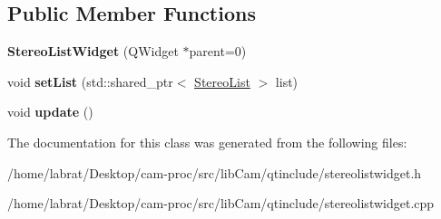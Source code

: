 \subsection*{Public Member Functions}
\begin{DoxyCompactItemize}
\item 
{\bfseries Stereo\+List\+Widget} (Q\+Widget $\ast$parent=0)\hypertarget{classStereoListWidget_afdd22e8bc248f89c250cd97e886f6301}{}\label{classStereoListWidget_afdd22e8bc248f89c250cd97e886f6301}

\item 
void {\bfseries set\+List} (std\+::shared\+\_\+ptr$<$ \hyperlink{classStereoList}{Stereo\+List} $>$ list)\hypertarget{classStereoListWidget_a9ec233895a793dbd219c05a74e0133af}{}\label{classStereoListWidget_a9ec233895a793dbd219c05a74e0133af}

\item 
void {\bfseries update} ()\hypertarget{classStereoListWidget_a3abad8a393a91d3ad85937c66efb96ea}{}\label{classStereoListWidget_a3abad8a393a91d3ad85937c66efb96ea}

\end{DoxyCompactItemize}


The documentation for this class was generated from the following files\+:\begin{DoxyCompactItemize}
\item 
/home/labrat/\+Desktop/cam-\/proc/src/lib\+Cam/qtinclude/stereolistwidget.\+h\item 
/home/labrat/\+Desktop/cam-\/proc/src/lib\+Cam/qtinclude/stereolistwidget.\+cpp\end{DoxyCompactItemize}
